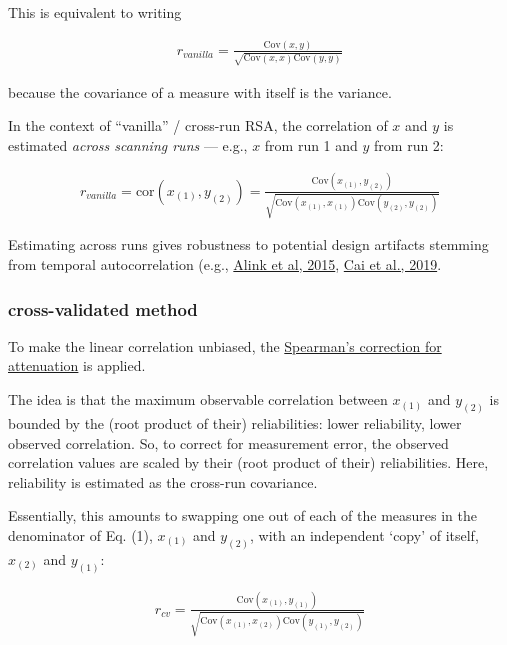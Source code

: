 \documentclass{article}\usepackage[]{graphicx}\usepackage[]{color}
\begin{document}
This is equivalent to writing

\begin{align*}
  r_\textit{vanilla} = \frac{\text{Cov}(x, y)}{\sqrt{\text{Cov}(x, x)\text{Cov}(y, y)}}
\end{align*}

because the covariance of a measure with itself is the variance.

In the context of ``vanilla'' / cross-run RSA, the correlation of $x$ and $y$  is estimated \textit{across scanning runs} --- e.g., $x$ from run 1 and $y$ from run 2:

\begin{align}
  r_\textit{vanilla} = \text{cor}(x_{(1)}, y_{(2)}) = 
  \frac{\text{Cov}(x_{(1)}, y_{(2)})}
  {\sqrt{\text{Cov}(x_{(1)}, x_{(1)})\text{Cov}(y_{(2)}, y_{(2)})}}
\end{align}

Estimating across runs gives robustness to potential design artifacts stemming from temporal autocorrelation (e.g., \href{https://www.biorxiv.org/content/10.1101/032391v2}{Alink et al, 2015}, \href{}{Cai et al., 2019}.


\subsubsection*{cross-validated method}

To make the linear correlation unbiased, the \href{https://en.wikipedia.org/wiki/Correction_for_attenuation}{Spearman's correction for attenuation} is applied.

The idea is that the maximum observable correlation between $x_{(1)}$ and $y_{(2)}$ is bounded by the (root product of their) reliabilities: lower reliability, lower observed correlation.
So, to correct for measurement error, the observed correlation values are scaled by their (root product of their) reliabilities.
Here, reliability is estimated as the cross-run covariance.

Essentially, this amounts to swapping one out of each of the measures in the denominator of Eq. (1), $x_{(1)}$ and  $y_{(2)}$, with an independent `copy' of itself, $x_{(2)}$ and $y_{(1)}$:

\begin{align}
  r_\textit{cv} = \frac
  {\text{Cov}(x_{(1)}, y_{(1)})}
  {\sqrt{\text{Cov}(x_{(1)}, x_{(2)})\text{Cov}(y_{(1)}, y_{(2)})}}
\end{align}
\end{document}
